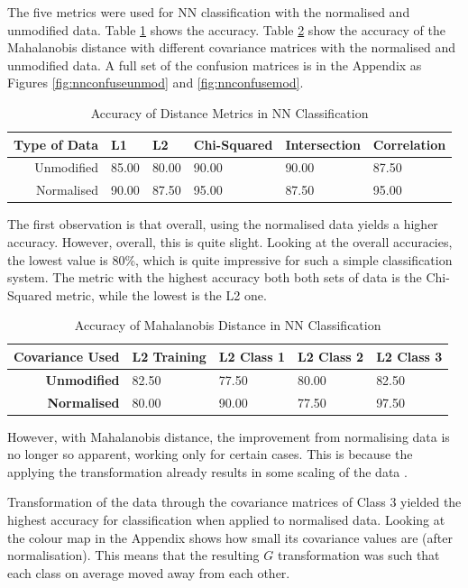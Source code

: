 \documentclass[a4paper, 10pt, conference]{ieeeconf}
\begin{document}
The five metrics were used for NN classification with the normalised and unmodified data. Table \ref{tbl:nn} shows the accuracy. Table \ref{tbl:nnmaha} show the accuracy of the Mahalanobis distance with different covariance matrices with the normalised and unmodified data. A full set of the confusion matrices is in the Appendix as Figures \ref{fig:nnconfuseunmod} and \ref{fig:nnconfusemod}.

\begin{table}[!ht]
\centering
\caption{Accuracy of Distance Metrics in NN Classification}
\label{tbl:nn}
\begin{tabular}{|r|lllll|}
\hline
\textbf{Type of Data} & \textbf{L1} & \textbf{L2} & \textbf{Chi-Squared} & \textbf{Intersection} & \textbf{Correlation}\\ \hline
Unmodified & 85.00 & 80.00 & 90.00 & 90.00 & 87.50\\
Normalised & 90.00 & 87.50 & 95.00 & 87.50 & 95.00\\ \hline
\end{tabular}
\end{table}

The first observation is that overall, using the normalised data yields a higher accuracy. However, overall, this is quite slight. Looking at the overall accuracies, the lowest value is 80\%, which is quite impressive for such a simple classification system. The metric with the highest accuracy both both sets of data is the Chi-Squared metric, while the lowest is the L2 one.

\begin{table}[!ht]
\centering
\caption{Accuracy of Mahalanobis Distance in NN Classification}
\label{tbl:nnmaha}
\begin{tabular}{|r|llll|}
\hline
\textbf{Covariance Used} & L2 Training & L2 Class 1 & L2 Class 2 & L2 Class 3\\ \hline
\textbf{Unmodified} & 82.50 & 77.50 & 80.00 & 82.50\\
\textbf{Normalised} & 80.00 & 90.00 & 77.50 & 97.50\\ \hline
\end{tabular}
\end{table}

However, with Mahalanobis distance, the improvement from normalising data is no longer so apparent, working only for certain cases. This is because the applying the transformation already results in some scaling of the data \cite{metrics}.

Transformation of the data through the covariance matrices of Class 3 yielded the highest accuracy for classification when applied to normalised data. Looking at the colour map in the Appendix shows how small its covariance values are (after normalisation). This means that the resulting $G$ transformation was such that each class on average moved away from each other.
\end{document}
